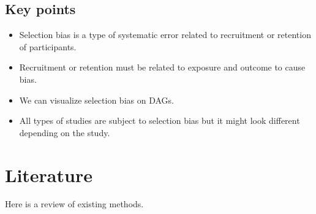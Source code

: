 \documentclass[
]{book}
\providecommand{\tightlist}{%
  \setlength{\itemsep}{0pt}\setlength{\parskip}{0pt}}
\begin{document}
\hypertarget{key-points}{%
\section{Key points}\label{key-points}}

\begin{itemize}
\tightlist
\item
  Selection bias is a type of systematic error related to recruitment or retention of participants.
\item
  Recruitment or retention must be related to exposure and outcome to cause bias.
\item
  We can visualize selection bias on DAGs.
\item
  All types of studies are subject to selection bias but it might look different depending on the study.
\end{itemize}

\hypertarget{literature}{%
\chapter{Literature}\label{literature}}

Here is a review of existing methods.

  
\end{document}

